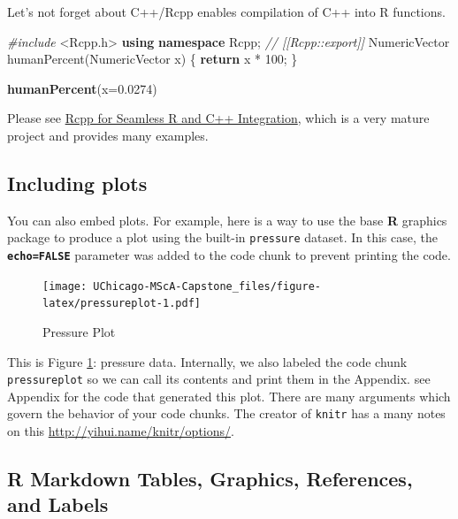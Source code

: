\documentclass[12pt,oneside]{chicagocapstone}
\newenvironment{Shaded}{\begin{snugshade}}{\end{snugshade}}
\newcommand{\CommentTok}[1]{\textcolor[rgb]{0.56,0.35,0.01}{\textit{#1}}}
\newcommand{\ControlFlowTok}[1]{\textcolor[rgb]{0.13,0.29,0.53}{\textbf{#1}}}
\newcommand{\DataTypeTok}[1]{\textcolor[rgb]{0.13,0.29,0.53}{#1}}
\newcommand{\DecValTok}[1]{\textcolor[rgb]{0.00,0.00,0.81}{#1}}
\newcommand{\FloatTok}[1]{\textcolor[rgb]{0.00,0.00,0.81}{#1}}
\newcommand{\ImportTok}[1]{#1}
\newcommand{\KeywordTok}[1]{\textcolor[rgb]{0.13,0.29,0.53}{\textbf{#1}}}
\newcommand{\NormalTok}[1]{#1}
\newcommand{\PreprocessorTok}[1]{\textcolor[rgb]{0.56,0.35,0.01}{\textit{#1}}}
\begin{document}
Let's not forget about C++/Rcpp enables compilation of C++ into R functions.
\begin{Shaded}
\begin{Highlighting}[]
\PreprocessorTok{#include }\ImportTok{<Rcpp.h>}
\KeywordTok{using} \KeywordTok{namespace}\NormalTok{ Rcpp;}
\CommentTok{// [[Rcpp::export]]}
\NormalTok{NumericVector humanPercent(NumericVector x) \{}
  \ControlFlowTok{return}\NormalTok{ x * }\DecValTok{100}\NormalTok{;}
\NormalTok{\}}
\end{Highlighting}
\end{Shaded}
\begin{Shaded}
\begin{Highlighting}[]
\KeywordTok{humanPercent}\NormalTok{(}\DataTypeTok{x=}\FloatTok{0.0274}\NormalTok{)}
\end{Highlighting}
\end{Shaded}
Please see \href{http://www.rcpp.org/}{Rcpp for Seamless R and C++ Integration}, which is a very mature project and provides many examples.

\newpage

\hypertarget{pressure-plot}{%
\subsection*{Including plots}\label{pressure-plot}}

You can also embed plots. For example, here is a way to use the base \textbf{R} graphics package to produce a plot using the built-in \texttt{pressure} dataset. In this case, the \textbf{\texttt{echo=FALSE}} parameter was added to the code chunk to prevent printing the code.
\begin{figure}
\centering
\texttt{[image: UChicago-MScA-Capstone\_files/figure-latex/pressureplot-1.pdf]}
\caption{\label{fig:pressureplot}Pressure Plot}
\end{figure}
This is Figure \ref{fig:pressureplot}: pressure data. Internally, we also labeled the code chunk \texttt{pressureplot} so we can call its contents and print them in the Appendix. see Appendix for the code that generated this plot. There are many arguments which govern the behavior of your code chunks. The creator of \texttt{knitr} has a many notes on this \url{http://yihui.name/knitr/options/}.

\newpage

\hypertarget{ref-labels}{%
\subsection*{R Markdown Tables, Graphics, References, and Labels}\label{ref-labels}}
\end{document}
